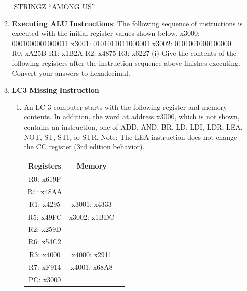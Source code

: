 \documentclass{article}
\begin{document}
\begin{enumerate}[label=(\alph*)]
\begin{enumerate}[label=(\alph*)]
        \newline
        .STRINGZ “AMONG US”
        \newpage
        \item \textbf{Executing ALU Instructions}: The following sequence of instructions is executed with the initial register values shown below.
        \newline
        \newline
        x3000: 0001000001000011
        \newline
        x3001: 0101011011000001
        \newline
        x3002: 0101001000100000
        \newline
        R0: xA25B
        R1: x1B2A
        R2: x4875
        R3: x6227
        \newline
        \newline
        (i) Give the contents of the following registers after the instruction sequence above finishes executing. Convert your answers to hexadecimal.
        \item \textbf{LC3 Missing Instruction}
        \begin{enumerate}[label=(\roman*)]
            \item An LC-3 computer starts with the following register and memory contents. In addition, the word at address x3000, which is not shown, contains an instruction, one of ADD, AND, BR, LD, LDI, LDR, LEA, NOT, ST, STI, or STR. Note: The LEA instruction does not change the CC register (3rd edition behavior).
            \begin{table}[h]
            \centering
            \begin{tabular}{|c|c|c|}
            \hline
            \textbf{Registers} & \textbf{Memory} & \\
            \hline
            R0: x619F & & \\
            \hline
            R4: x48AA & & \\
            \hline
            R1: x4295 & x3001: x4333 & \\
            \hline
            R5: x49FC & x3002: x1BDC & \\
            \hline
            R2: x259D & & \\
            \hline
            R6: x54C2 & & \\
            \hline
            R3: x4000 & x4000: x2911 & \\
            \hline
            R7: xF914 & x4001: x68A8 & \\
            \hline
            PC: x3000 & & \\

\end{tabular}
\end{table}
\end{enumerate}
\end{enumerate}
\end{enumerate}
\end{document}
